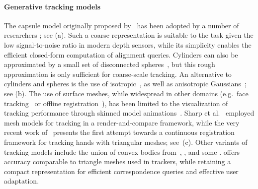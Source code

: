 \paragraph{Generative tracking models}
The capsule model originally proposed by~\cite{rehg1994tracking} has been adopted by a number of researchers \cite{oiko2011hand,schroder2014real,fleishman2015icpik,tagliasacchi2015robust}; see (a). Such a coarse representation is suitable to the task given the low signal-to-noise ratio in modern depth sensors, while its simplicity enables the efficient closed-form computation of alignment queries. Cylinders can also be approximated by a small set of disconnected spheres~\cite{qian2014realtime}, but this rough approximation is only sufficient for coarse-scale tracking. An alternative to cylinders and spheres is the use of isotropic~\cite{sridhar2013multicam,sridhar2015fast}, as well as anisotropic Gaussians~\cite{sridhar2014anisotropic}; see (b).
% 
%
The use of surface meshes, while widespread in other domains (e.g.\ face tracking~\cite{bouaziz2013online} or offline registration~\cite{loper_eccv14}), has been limited to the visualization of tracking performance through skinned model animations~\cite{tompson2014real,schroder2014real}. Sharp et al.~ employed mesh models for tracking in a render-and-compare framework, while the very recent work of~\cite{taylor2016concerto} presents the first attempt towards a continuous registration framework for tracking hands with triangular meshes; see~(c).
%
Other variants of tracking models include the union of convex bodies from~\cite{melax2013dynamics}, , and some .
% 
 offers accuracy comparable to triangle meshes used in  trackers, while retaining a compact representation for efficient correspondence queries and effective user adaptation.


